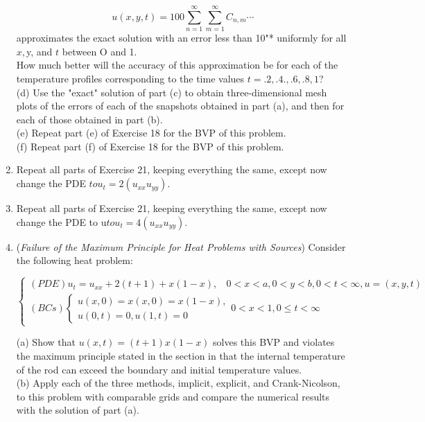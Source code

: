 \documentclass[../main.tex]{subfiles}
\begin{document}
\begin{enumerate}
$$
u(x,y,t)=100 \sum_{n=1}^{\infty} \sum_{m=1}^{\infty} C_{n,m} \cdots
$$
approximates the exact solution with an error less than 10"* uniformly for all $x, $y, and $t$ between O and 1. 
\\
How much better will the accuracy of this approximation be for each of the temperature profiles corresponding to the time values $t = .2, .4., .6, .8, 1$?
\\
(d) Use the "exact" solution of part (c) to obtain three-dimensional mesh plots of the errors of each of the snapshots obtained in part (a), and then for each of those obtained in part (b). 
\\
(e) Repeat part (e) of Exercise 18 for the BVP of this problem. 
\\
(f) Repeat part (f) of Exercise 18 for the BVP of this problem. 
		\item
Repeat all parts of Exercise 21, keeping everything the same, except now change the PDE $to u_t =2(u_{xx} u_{yy})$.
		\item
			Repeat all parts of Exercise 21, keeping everything the same, except now change the PDE to u$to u_t =4(u_{xx} u_{yy})$. 
		\item
			(\textit{Failure of the Maximum Principle for Heat Problems with Sources}) Consider the following heat problem: 

$$\begin{cases} 
	(PDE) u_t=u_{xx}+2(t+1)+x(1-x),
	~~~~0<x<a, 0<y<b, 0<t<\infty,u=(x,y,t)\\
(BCs)
		\begin{cases}
		u(x,0)=x(x,0)=x(1-x),\\
		u(0,t)=0, u(1,t)=0
		\end{cases}
		 0 < x< 1, 0 \leqslant t< \infty 
	\end{cases}$$

(a) Show that $u(x,t) = (t + 1)x(1-x)$ solves this BVP and violates the maximum principle stated in the section in that the internal temperature of the rod can exceed the boundary and initial temperature values. 
\\
(b) Apply each of the three methods, implicit, explicit, and Crank-Nicolson, to this problem with comparable grids and compare the numerical results with the solution of part (a). 
\end{enumerate}
\end{document}
